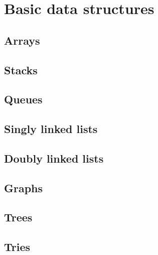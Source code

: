 \chapter{Basic data structures}
\section{Arrays}


\section{Stacks}


\section{Queues}


\section{Singly linked lists}


\section{Doubly linked lists}


\section{Graphs}


\section{Trees}


\section{Tries}